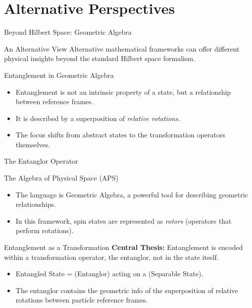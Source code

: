 \section{Alternative Perspectives}

\begin{frame}{Beyond Hilbert Space: Geometric Algebra}
  \begin{block}{An Alternative View}
    Alternative mathematical frameworks can offer different physical insights
    beyond the standard Hilbert space formalism.
  \end{block}
  \pause
  \begin{alertblock}{Entanglement in Geometric Algebra}
    \begin{itemize}
      \item Entanglement is not an intrinsic property of a state, but a
        relationship between reference frames.
      \pause
      \item It is described by a superposition of \emph{relative rotations}.
      \pause
      \item The focus shifts from abstract states to the transformation
        operators themselves.
    \end{itemize}
  \end{alertblock}
\end{frame}

\begin{frame}{The Entanglor Operator}
  \begin{block}{The Algebra of Physical Space (APS)}
    \begin{itemize}
      \item The language is Geometric Algebra, a powerful tool for describing
        geometric relationships.
      \item In this framework, spin states are represented as \emph{rotors}
        (operators that perform rotations).
    \end{itemize}
  \end{block}
  \pause
  \begin{alertblock}{Entanglement as a Transformation}
    \textbf{Central Thesis:} Entanglement is encoded within a transformation
    operator, the \alert{entanglor}, not in the state itself.
    \begin{itemize}
      \item Entangled State = (Entanglor) acting on a (Separable State).
      \item The entanglor contains the geometric info of the superposition of
        relative rotations between particle reference frames.
    \end{itemize}
  \end{alertblock}
\end{frame}

